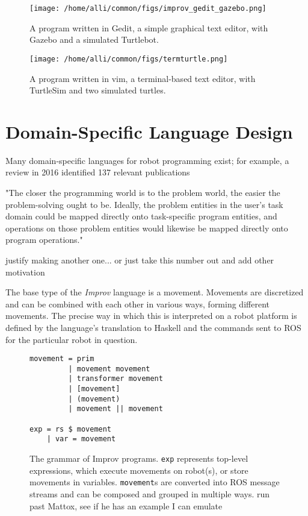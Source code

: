\documentclass[sigconf]{acmart}
\begin{document}
\begin{figure}[h]
\centering
\texttt{[image: /home/alli/common/figs/improv\_gedit\_gazebo.png]}
\caption{A program written in Gedit, a simple graphical text editor, with Gazebo and a simulated
Turtlebot.\label{gedit}}
\end{figure}

\begin{figure}[h]
\centering
\texttt{[image: /home/alli/common/figs/termturtle.png]}
\caption{A program written in vim, a terminal-based text editor, with TurtleSim and two
simulated turtles.\label{vim}}
\end{figure}



\section{Domain-Specific Language
Design}\label{domain-specific-language-design}

Many domain-specific languages for robot programming exist; for example, a
review in 2016 identified 137 relevant publications 

"The closer the programming world is to the problem world, the easier the
problem-solving ought to be. Ideally, the problem entities in the user's task
domain could be mapped directly onto task-specific program entities, and
operations on those problem entities would likewise be mapped directly onto
program operations."


{\color{red} justify making another one... or just take this number out and add
other motivation}

The base type of the \emph{Improv} language is a movement. Movements are
discretized and can be combined with each other in various ways, forming
different movements. The precise way in which this is interpreted on a
robot platform is defined by the language's translation to Haskell and
the commands sent to ROS for the particular robot in question.

\begin{figure}
\centering
\begin{verbatim}
movement = prim
         | movement movement
         | transformer movement
         | [movement]
         | (movement)
         | movement || movement 

exp = rs $ movement
    | var = movement
\end{verbatim}
\caption{The grammar of Improv programs. \texttt{exp} represents top-level
expressions, which execute movements on robot(s), or store movements in
variables. \texttt{movement}s are converted into ROS message streams and can be
composed and grouped in multiple ways. {\color{red} run past Mattox, see if he
has an example I can emulate}}

\end{figure}
\end{document}
